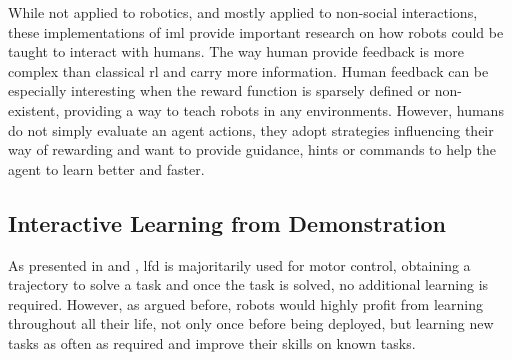 

While not applied to robotics, and mostly applied to non-social interactions, these implementations of \gls{iml} provide important research on how robots could be taught to interact with humans. The way human provide feedback is more complex than classical \gls{rl} and carry more information. Human feedback can be especially interesting when the reward function is sparsely defined or non-existent, providing a way to teach robots in any environments. However, humans do not simply evaluate an agent actions, they adopt strategies influencing their way of rewarding and want to provide guidance, hints or commands to help the agent to learn better and faster.


\subsection{Interactive Learning from Demonstration}

As presented in \cite{argall2009survey} and \cite{billard2008robot}, \gls{lfd} is majoritarily used for motor control, obtaining a trajectory to solve a task and once the task is solved, no additional learning is required. However, as argued before, robots would highly profit from learning throughout all their life, not only once before being deployed, but learning new tasks as often as required and improve their skills on known tasks.

